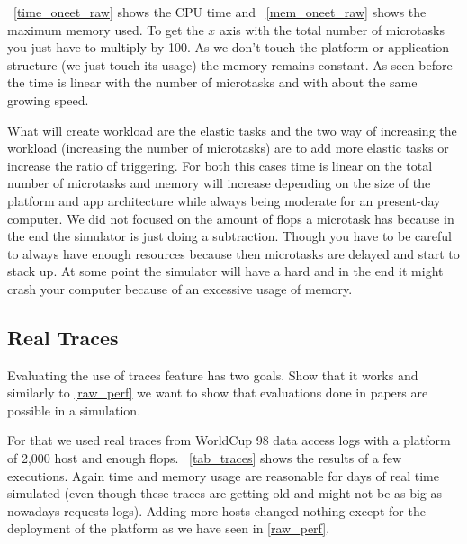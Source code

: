 \documentclass[a4paper, onecolumn, 11pt]{article}
\begin{document}
    \figurename~\ref{time_oneet_raw} shows the CPU time and
    \figurename~\ref{mem_oneet_raw} shows the maximum memory used. To get the
    $x$ axis with the total number of microtasks you just have to multiply by
    100. As we don't touch the platform or application structure (we just touch
    its usage) the memory remains constant. As seen before the time is linear 
    with the number of microtasks and with about the same growing speed.
    
    What will create workload are the elastic tasks and the two way of 
    increasing the workload (increasing the number of microtasks) are to add 
    more elastic tasks or increase the ratio of triggering. For both this cases 
    time is linear on the total number of microtasks and memory will increase 
    depending on the size of the platform and app architecture while always 
    being moderate for an present-day computer. We did not focused on the 
    amount of flops a microtask has because in the end the simulator is just 
    doing a subtraction. Though you have to be careful to always have enough 
    resources because then microtasks are delayed and start to stack up. At 
    some point the simulator will have a hard and in the end it might crash 
    your computer because of an excessive usage of memory.
    
    
       
  \subsection{Real Traces} \label{real_traces}
		Evaluating the use of traces feature has two goals. Show that it works and 
		similarly to \ref{raw_perf} we want to show that evaluations done in papers 
		are possible in a simulation.
  
    For that we used real traces from WorldCup 98 data access logs \cite{wc98}
    with a platform of 2,000 host and enough flops. \figurename~\ref{tab_traces}
    shows the results of a few executions. Again time and memory usage are
    reasonable for days of real time simulated (even though these traces are
    getting old and might not be as big as nowadays requests logs). Adding more
    hosts changed nothing except for the deployment of the platform as we have
    seen in \ref{raw_perf}.
\end{document}
